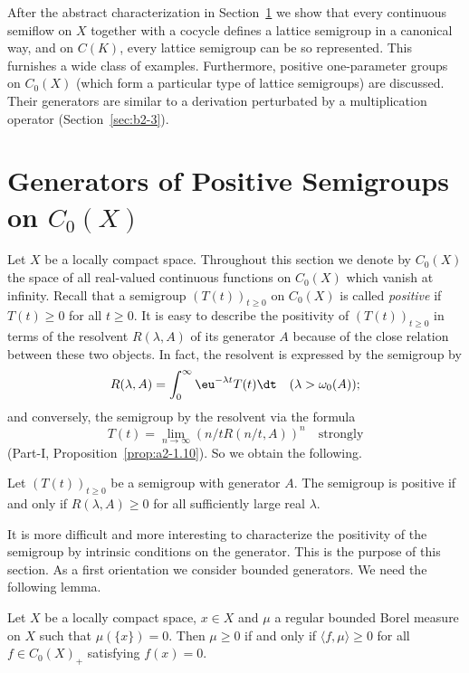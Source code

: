 After the abstract characterization in Section~\ref{sec:b2-1} we show that every continuous semiflow on $X$ together with a cocycle defines a lattice semigroup in a canonical way, and on $C(K)$, every lattice semigroup can be so represented.
This furnishes a wide class of examples.
Furthermore, positive one-parameter groups on $C_{0}(X)$ (which form a particular type of lattice semigroups) are discussed.
Their generators are similar to a derivation perturbated by a multiplication operator (Section~\ref{sec:b2-3}).

\section{Generators of Positive Semigroups on  \texorpdfstring{$C_{0}(X)$}{C(X)}} \label{sec:b2-1}%
Let $X$ be a locally compact space.
Throughout this section we denote by $C_{0}(X)$ the space of all real-valued continuous functions on $C_{0}(X)$ which vanish at infinity.
Recall that a semigroup $(T(t))_{t \geq 0}$ on $C_{0}(X)$ is called \emph{positive} if\/ $T(t) \geq 0$ for all $t \geq 0$.
It is easy to describe the positivity of\/ $(T(t))_{t \geq 0}$ in terms of the resolvent $R(\lambda,A)$ of its generator $A$ because of the close relation between these two objects.
In fact, the resolvent is expressed by the semigroup by
\begin{equation}\label{eq:b2-1.1}
R(\lambda,A) = \int_{0}^{\infty} \eu^{-\lambda t} T(t) \dt \quad (\lambda > \omega_{0}(A));
\end{equation}
and conversely, the semigroup by the resolvent via the formula
\begin{equation}\label{eq:b2-1.2}
T(t) = \lim_{n \to \infty} (n/tR(n/t,A))^{n} \quad \text{strongly}
\end{equation}
(\cf Part-I, Proposition~\ref{prop:a2-1.10}).
So we obtain the following.
\begin{proposition}\label{prop:b2-1.1}%
Let $(T(t))_{t \geq 0}$ be a semigroup with generator $A$.
The semigroup is positive if and only if\/ $R(\lambda,A) \geq 0$ for all sufficiently large real $\lambda$.
\end{proposition}
It is more difficult and more interesting to characterize the positivity of the semigroup by intrinsic conditions on the generator.
This is the purpose of this section.
As a first orientation we consider bounded generators.
We need the following lemma.
\begin{lemma}\label{lem:b2-1.2}
Let $X$ be a locally compact space, $x \in X$ and $\mu$ a regular bounded Borel measure on $X$ such that $\mu(\{x\}) = 0$.
Then $\mu \geq 0$ if and only if\/ $\langle f,\mu \rangle \geq 0$ for all $f \in C_{0}(X)_{+}$ satisfying $f(x) = 0$.
\end{lemma}
